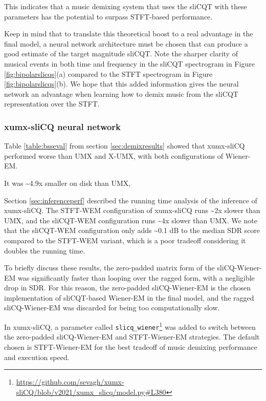 \documentclass[report.tex]{subfiles}
\begin{document}
This indicates that a music demixing system that uses the sliCQT with these parameters has the potential to surpass STFT-based performance.

Keep in mind that to translate this theoretical boost to a real advantage in the final model, a neural network architecture must be chosen that can produce a good estimate of the target magnitude sliCQT. Note the sharper clarity of musical events in both time and frequency in the sliCQT spectrogram in Figure \ref{fig:bipolarslicqs}(a) compared to the STFT spectrogram in Figure \ref{fig:bipolarslicqs}(b). We hope that this added information gives the neural network an advantage when learning how to demix music from the sliCQT representation over the STFT.

\subsubsection{xumx-sliCQ neural network}
\label{sec:netdiscuss}

Table \ref{table:bsseval} from section \ref{sec:demixresults} showed that xumx-sliCQ performed worse than UMX and X-UMX, with both configurations of Wiener-EM.

It was \textasciitilde4.9x smaller on disk than UMX,

Section \ref{sec:inferenceperf} described the running time analysis of the inference of xumx-sliCQ. The STFT-WEM configuration of xumx-sliCQ runs \textasciitilde2x slower than UMX, and the sliCQT-WEM configuration runs \textasciitilde4x slower than UMX. We note that the sliCQT-WEM configuration only adds \textasciitilde0.1 dB to the median SDR score compared to the STFT-WEM variant, which is a poor tradeoff considering it doubles the running time.

To briefly discuss these results, the zero-padded matrix form of the sliCQ-Wiener-EM was significantly faster than looping over the ragged form, with a negligible drop in SDR. For this reason, the zero-padded sliCQ-Wiener-EM is the chosen implementation of sliCQT-based Wiener-EM in the final model, and the ragged sliCQ-Wiener-EM was discarded for being too computationally slow.

In xumx-sliCQ, a parameter called \Verb#slicq_wiener#\footnote{\url{https://github.com/sevagh/xumx-sliCQ/blob/v2021/xumx_slicq/model.py\#L380}} was added to switch between the zero-padded sliCQ-Wiener-EM and STFT-Wiener-EM strategies. The default chosen is STFT-Wiener-EM for the best tradeoff of music demixing performance and execution speed.
\end{document}
